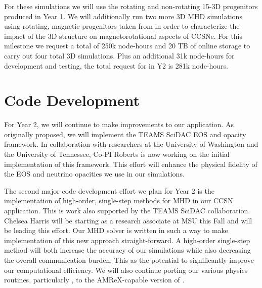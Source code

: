 \documentclass[12pt]{article}
\begin{document}
For these simulations we will use the rotating and non-rotating 15-\msun 3D progenitors produced in Year 1.
We will additionally run two more 3D MHD simulations using rotating, magnetic progenitors taken from \citet{heger:2005} in order to characterize the impact of the 3D structure on magnetorotational aspects of CCSNe.
For this milestone we request a total of 250k \thet node-hours and 20 TB of online storage to carry out four total 3D simulations.
Plus an additional 31k \thet node-hours for development and testing, the total request for \thet in Y2 is 281k node-hours.

\section{Code Development}

For Year 2, we will continue to make improvements to our \sparkmone application.
As originally proposed, we will implement the TEAMS SciDAC EOS and opacity framework. 
In collaboration with researchers at the University of Washington and the University of Tennessee, Co-PI Roberts is now working on the initial implementation of this framework.
This effort will enhance the physical fidelity of the EOS and neutrino opacities we use in our simulations. 

The second major code development effort we plan for Year 2 is the implementation of high-order, single-step methods for MHD in our CCSN application.
This is work also supported by the TEAMS SciDAC collaboration.
Chelsea Harris will be starting as a research associate at MSU this Fall and will be leading this effort. 
Our \spark MHD solver is written in such a way to make implementation of this new approach straight-forward. 
A high-order single-step method will both increase the accuracy of our simulations while also decreasing the overall communication burden. 
This as the potential to significantly improve our computational efficiency.
We will also continue porting our various physics routines, particularly \spark, to the AMReX-capable version of \flash.

\renewcommand\bibsection{\section*{References}}
\setlength{\bibsep}{2pt}

\end{document}
